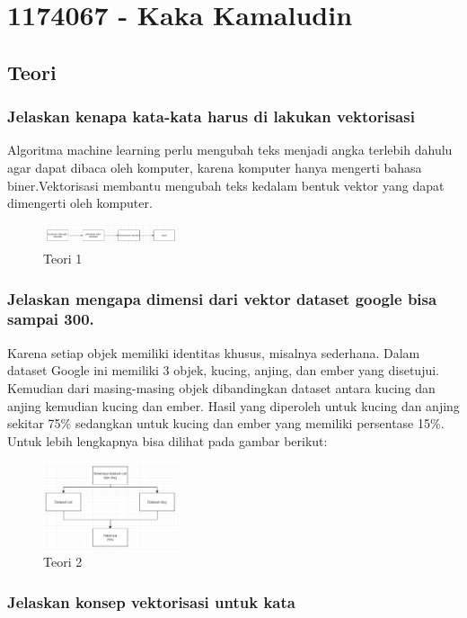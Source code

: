 \section{1174067 - Kaka Kamaludin}
\subsection{Teori}
\subsubsection{Jelaskan kenapa kata-kata harus di lakukan vektorisasi}

\hfill\break
Algoritma machine learning perlu mengubah teks menjadi angka terlebih dahulu agar dapat dibaca oleh komputer, karena komputer hanya mengerti bahasa biner.Vektorisasi membantu mengubah teks kedalam bentuk vektor yang dapat dimengerti oleh komputer. 
\begin{figure}[H]
\includegraphics[width=4cm]{figures/1174067/5/1.jpg}
\centering
\caption{Teori 1}
\end{figure}

\subsubsection{Jelaskan mengapa dimensi dari vektor dataset google bisa sampai 300.}

\hfill\break
Karena setiap objek memiliki identitas khusus, misalnya sederhana. Dalam dataset Google ini memiliki 3 objek, kucing, anjing, dan ember yang disetujui. Kemudian dari masing-masing objek dibandingkan dataset antara kucing dan anjing kemudian kucing dan ember. Hasil yang diperoleh untuk kucing dan anjing sekitar 75\% sedangkan untuk kucing dan ember yang memiliki persentase 15\%. Untuk lebih lengkapnya bisa dilihat pada gambar berikut: 
\begin{figure}[H]
\includegraphics[width=4cm]{figures/1174067/5/2.jpg}
\centering
\caption{Teori 2}
\end{figure}

\subsubsection{Jelaskan konsep vektorisasi untuk kata}

